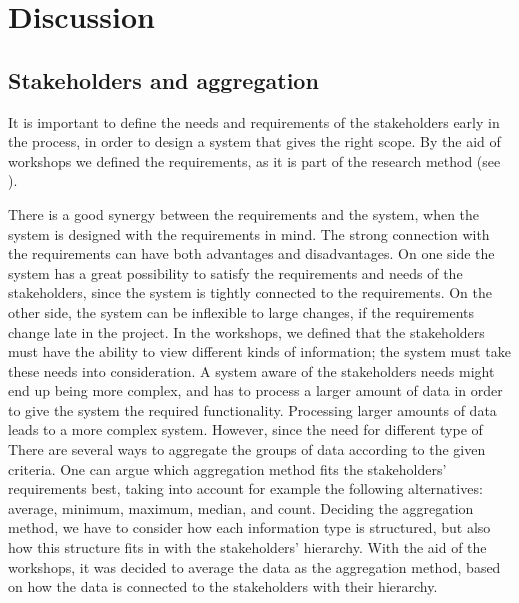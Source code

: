 \chapter{Discussion}
\label{chapter:discussion}

\section{Stakeholders and aggregation} %
\label{sec:discussion_stakeholders_and_aggregation}
It is important to define the needs and requirements of the stakeholders early 
in the process, in order to design a system that gives the right scope. 
By the aid of workshops we defined the requirements, as it is part of the 
research method (see ).

There is a good synergy between the requirements and the system, when the 
system is designed with the requirements in mind. The strong connection with 
the requirements can have both advantages and disadvantages. On one side the 
system has a great possibility to satisfy the requirements and needs of the 
stakeholders, since the system is tightly connected to the requirements. On 
the other side, the system can be inflexible to large changes, if the 
requirements change late in the project.  In the workshops, we defined that 
the stakeholders must have the ability to view different kinds of information; 
the system must take these needs into consideration. A system aware of the 
stakeholders needs might end up being more complex, and has to process a 
larger amount of data in order to give the system the required functionality. 
Processing larger amounts of data leads to a more complex system. However, 
since the need for different type of 
There are several ways to aggregate the groups of data according to the given 
criteria. One can argue which aggregation method fits the stakeholders' 
requirements best, taking into account for example the following alternatives: 
average, minimum, maximum, median, and count. Deciding the aggregation method, 
we have to consider how each information type is structured, but also how this 
structure fits in with the stakeholders' hierarchy. With the aid of the 
workshops, it was decided to average the data as the aggregation method, based 
on how the data is connected to the stakeholders with their hierarchy.



